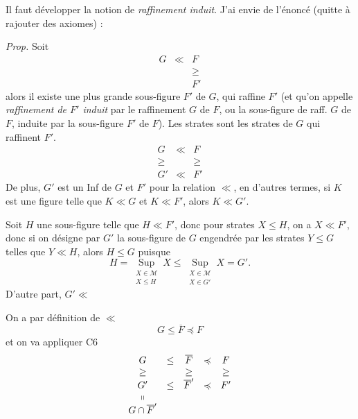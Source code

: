 \documentclass[11pt,a4paper]{article}
\begin{document}
Il faut développer la notion de \emph{raffinement induit}. J'ai envie de \struck{\ill{}} \add{\ill{}} l'énoncé (quitte à rajouter des axiomes) :

\struck{\ill{}} \emph{Prop.} \quad Soit
\[
  \begin{array}{ccc}
    G & \ll & F \\
    & & \geq \\
    & & F'
  \end{array}
\]
alors il existe une plus grande sous-figure $F'$ de $G$, qui raffine $F'$ (et qu'on appelle \emph{raffinement de $F'$ induit} \struck{\ill{}} par le raffinement $G$ de $F$, ou la sous-figure de  raff. $G$ de $F$, induite par la sous-figure $F'$ de $F$). \struck{\ill{}} Les strates  sont les strates de $G$ qui raffinent $F'$. 
\[
  \begin{array}{ccc}
    G & \ll & F \\
    \geq & & \geq \\
    G' & \ll & F'
  \end{array}
\]
De plus, $G'$ est un Inf de $G$ et $F'$ pour la relation $\ll$, en d'autres termes, si  $K$ est une figure telle que $K \ll G$ et $K \ll F'$, alors $K \ll G'$.

 Soit $H$ une sous-figure \add{\ill{}} telle que $H \ll F'$, donc pour  strates $X \leq H$, on a $X \ll F'$, donc si on désigne par $G'$ la sous-figure de $G$ engendrée par les strates $Y \leq G$ telles que $Y \ll H$, alors \struck{\ill{}} $H \leq G$ puisque
\[
  H = \operatorname*{Sup}_{\substack{X \in \mathcal{M} \\ X \leq H}} X \leq \operatorname*{Sup}_{\substack{X \in \mathcal{M} \\ X \in G'}} X = G' .
\]
D'autre part, $G' \ll$

On a par définition de $\ll$
\[
  G \leq \overline{F} \preccurlyeq F
\]
et on va appliquer C6
\[
  \begin{array}{ccccc}
    G & \leq & \overline{F} & \preccurlyeq & F \\
    \geq & & \geq & & \geq \\
    G' & \leq & \overline{F}' & \preccurlyeq & F' \\
    \shortparallel & & & & \\
    G \cap \overline{F}' & & & &
  \end{array}
\]
\end{document}
